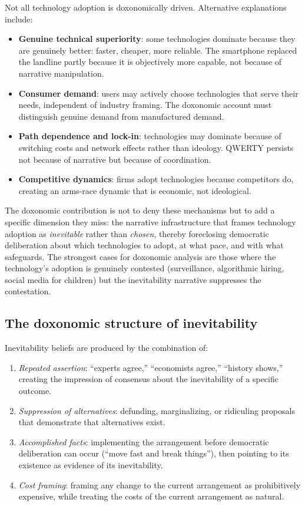 Not all technology adoption is doxonomically driven.
Alternative explanations include:
\begin{itemize}[nosep]
  \item \textbf{Genuine technical superiority}: some technologies dominate because they are genuinely better: faster, cheaper, more reliable. The smartphone replaced the landline partly because it is objectively more capable, not because of narrative manipulation.
  \item \textbf{Consumer demand}: users may actively choose technologies that serve their needs, independent of industry framing. The doxonomic account must distinguish genuine demand from manufactured demand.
  \item \textbf{Path dependence and lock-in}: technologies may dominate because of switching costs and network effects rather than ideology. QWERTY persists not because of narrative but because of coordination.
  \item \textbf{Competitive dynamics}: firms adopt technologies because competitors do, creating an arms-race dynamic that is economic, not ideological.
\end{itemize}
The doxonomic contribution is not to deny these mechanisms but to add a specific dimension they miss: the narrative infrastructure that frames technology adoption as \emph{inevitable} rather than \emph{chosen}, thereby foreclosing democratic deliberation about which technologies to adopt, at what pace, and with what safeguards.
The strongest cases for doxonomic analysis are those where the technology's adoption is genuinely contested (surveillance, algorithmic hiring, social media for children) but the inevitability narrative suppresses the contestation.

\subsection{The doxonomic structure of inevitability}

\begin{model}
\label{mod:inevitability}
Inevitability beliefs are produced by the combination of:
\begin{enumerate}[nosep]
  \item \emph{Repeated assertion}: ``experts agree,'' ``economists agree,'' ``history shows,'' creating the impression of consensus about the inevitability of a specific outcome.
  \item \emph{Suppression of alternatives}: defunding, marginalizing, or ridiculing proposals that demonstrate that alternatives exist.
  \item \emph{Accomplished facts}: implementing the arrangement before democratic deliberation can occur (``move fast and break things''), then pointing to its existence as evidence of its inevitability.
  \item \emph{Cost framing}: framing any change to the current arrangement as prohibitively expensive, while treating the costs of the current arrangement as natural.
\end{enumerate}
\end{model}

